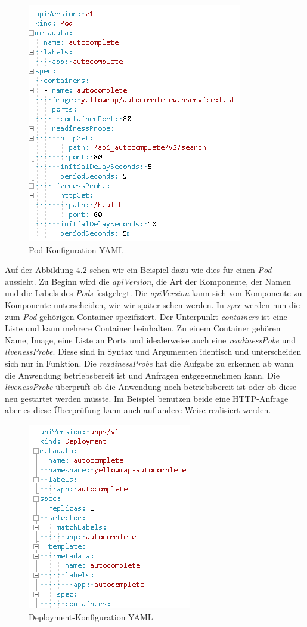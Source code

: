 \documentclass[12pt,a4paper]{scrartcl}
\begin{document}
\begin{figure}[h!]
	\centering
	\includegraphics[scale=1]{KubeYmlPod.png}
	\caption[Screenshot]{Pod-Konfiguration YAML}
\end{figure}

Auf der Abbildung 4.2 sehen wir ein Beispiel dazu wie dies für einen \emph{Pod} aussieht. Zu Beginn wird die \emph{apiVersion}, die Art der Komponente, der Namen und die Labels des \emph{Pods} festgelegt. Die \emph{apiVersion} kann sich von Komponente zu Komponente unterscheiden, wie wir später sehen werden. In \emph{spec} werden nun die zum \emph{Pod} gehörigen Container spezifiziert. Der Unterpunkt \emph{containers} ist eine Liste und kann mehrere Container beinhalten. Zu einem Container gehören Name, Image, eine Liste an Ports und idealerweise auch eine \emph{readinessPobe} und \emph{livenessProbe}.  Diese sind in Syntax und Argumenten identisch und unterscheiden sich nur in Funktion. Die \emph{readinessProbe} hat die Aufgabe zu erkennen ab wann die Anwendung betriebsbereit ist und Anfragen entgegennehmen kann. Die \emph{livenessProbe} überprüft ob die Anwendung noch betriebsbereit ist oder ob diese neu gestartet werden müsste. Im Beispiel benutzen beide eine HTTP-Anfrage aber es diese Überprüfung kann auch auf andere Weise realisiert werden.

\begin{figure}[h!]
	\centering
	\includegraphics[scale=1]{KubeYmlDep.png}
	\caption[Screenshot]{Deployment-Konfiguration YAML}
\end{figure}
\end{document}
